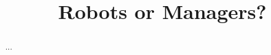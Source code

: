 \documentclass{main}
\title{Robots or Managers?}
\begin{document}
\begin{abstract}
...
\end{abstract}

\end{document}
